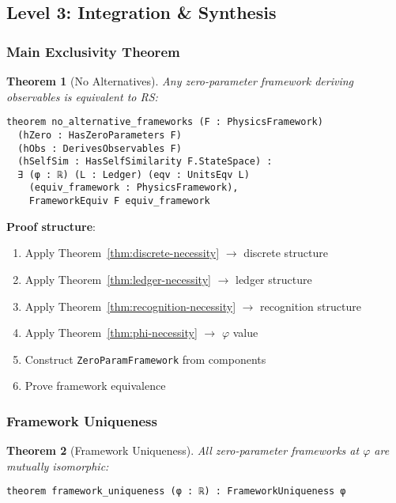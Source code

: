 \documentclass[11pt]{article}
\newtheorem{theorem}{Theorem}[section]
\theoremstyle{definition}
\theoremstyle{remark}
\begin{document}
\subsection{Level 3: Integration \& Synthesis}

\subsubsection{Main Exclusivity Theorem}

\begin{theorem}[No Alternatives]
\label{thm:main-exclusivity}
Any zero-parameter framework deriving observables is equivalent to RS:
\begin{lstlisting}[language=lean]
theorem no_alternative_frameworks (F : PhysicsFramework)
  (hZero : HasZeroParameters F)
  (hObs : DerivesObservables F)
  (hSelfSim : HasSelfSimilarity F.StateSpace) :
  ∃ (φ : ℝ) (L : Ledger) (eqv : UnitsEqv L)
    (equiv_framework : PhysicsFramework),
    FrameworkEquiv F equiv_framework
\end{lstlisting}
\end{theorem}

\textbf{Proof structure}:
\begin{enumerate}
\item Apply Theorem~\ref{thm:discrete-necessity} $\rightarrow$ discrete structure
\item Apply Theorem~\ref{thm:ledger-necessity} $\rightarrow$ ledger structure
\item Apply Theorem~\ref{thm:recognition-necessity} $\rightarrow$ recognition structure
\item Apply Theorem~\ref{thm:phi-necessity} $\rightarrow$ $\varphi$ value
\item Construct \texttt{ZeroParamFramework} from components
\item Prove framework equivalence
\end{enumerate}

\subsubsection{Framework Uniqueness}

\begin{theorem}[Framework Uniqueness]
All zero-parameter frameworks at $\varphi$ are mutually isomorphic:
\begin{lstlisting}[language=lean]
theorem framework_uniqueness (φ : ℝ) : FrameworkUniqueness φ
\end{lstlisting}
\end{theorem}
\end{document}
